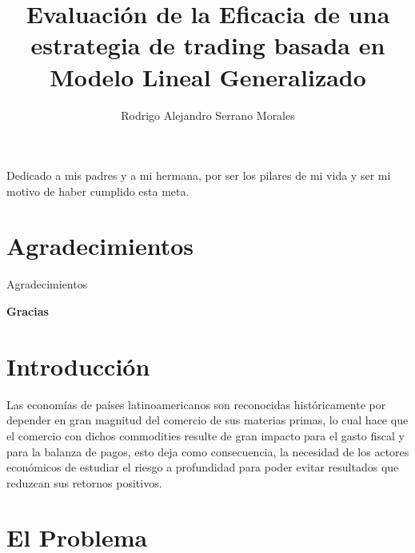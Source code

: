 \documentclass[a4paper,12pt]{Latex/Classes/PhDthesisPSnPDF}
\title{Evaluación de la Eficacia de una estrategia de trading basada en Modelo Lineal Generalizado}
\author{Rodrigo Alejandro Serrano Morales}
\begin{document}


\maketitle									%

\newpage\renewcommand{\thepage}{\arabic{page}}\setcounter{page}{1} 


\begin{dedication}
Dedicado a mis padres y a mi hermana, por ser los pilares de mi vida y ser mi motivo de haber cumplido esta meta.
\end{dedication}
\newpage
\chapter*{Agradecimientos}

Agradecimientos




  \begin{flushright}
  \textbf{Gracias}
  \end{flushright}

\tableofcontents
\listoffigures
\listoftables



\chapter*{Introducción}

Las economías de países latinoamericanos son reconocidas históricamente por depender en gran magnitud del comercio de sus materias primas, lo cual hace que el comercio con dichos commodities resulte de gran impacto para el gasto fiscal y para la balanza de pagos, esto deja como consecuencia, la necesidad de los actores económicos de estudiar el riesgo a profundidad para poder evitar resultados que reduzcan sus retornos positivos.\\ 


\chapter{El Problema}
\end{document}
